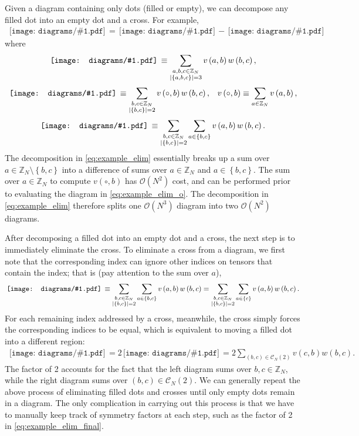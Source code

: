 \documentclass[nofootinbib,notitlepage,11pt]{revtex4-2}
\newcommand{\p}[1]{\left(#1\right)} %
\renewcommand{\set}[1]{\left\{#1\right\}} %
\newcommand{\1}{\mathds{1}}
\newcommand{\C}{\mathcal{C}}
\renewcommand{\O}{\mathcal{O}}
\newcommand{\ZZ}{\mathbb{Z}}
\newcommand{\diagram}[1]
{\,\texttt{[image: diagrams/\#1.pdf]}\,}
\begin{document}
Given a diagram containing only dots (filled or empty), we can
decompose any filled dot into an empty dot and a cross.  For example,
\begin{align}
  \diagram{example_elim}
  = \diagram{example_elim_o}
  - \diagram{example_elim_x}
  \label{eq:example_elim}
\end{align}
where
\begin{align}
  \diagram{example_elim}
  \equiv \sum_{\substack{a,b,c\in\ZZ_N\\\abs{\set{a,b,c}}=3}}
  v\p{a,b} w\p{b,c},
\end{align}
\begin{align}
  \diagram{example_elim_o}
  \equiv \sum_{\substack{b,c\in\ZZ_N\\\abs{\set{b,c}}=2}}
  v\p{\circ,b} w\p{b,c},
  &&
  v\p{\circ,b} \equiv \sum_{a\in\ZZ_N} v\p{a,b},
  \label{eq:example_elim_o}
\end{align}
\begin{align}
  \diagram{example_elim_x}
  \equiv \sum_{\substack{b,c\in\ZZ_N\\\abs{\set{b,c}}=2}}
  \sum_{a\in\set{b,c}} v\p{a,b} w\p{b,c}.
\end{align}
The decomposition in \eqref{eq:example_elim} essentially breaks up a
sum over $a\in\ZZ_N\setminus\set{b,c}$ into a difference of sums over
$a\in\ZZ_N$ and $a\in\set{b,c}$.  The sum over $a\in\ZZ_N$ to compute
$v\p{\circ,b}$ has $\O\p{N^2}$ cost, and can be performed prior to
evaluating the diagram in \eqref{eq:example_elim_o}.  The
decomposition in \eqref{eq:example_elim} therefore splits one
$\O\p{N^3}$ diagram into two $\O\p{N^2}$ diagrams.

After decomposing a filled dot into an empty dot and a cross, the next
step is to immediately eliminate the cross.  To eliminate a cross from
a diagram, we first note that the corresponding index can ignore other
indices on tensors that contain the index; that is (pay attention to
the sum over $a$),
\begin{align}
  \diagram{example_elim_x}
  \equiv \sum_{\substack{b,c\in\ZZ_N\\\abs{\set{b,c}}=2}}
  \sum_{a\in\set{b,c}} v\p{a,b} w\p{b,c}
  = \sum_{\substack{b,c\in\ZZ_N\\\abs{\set{b,c}}=2}}
  \sum_{a\in\set{c}} v\p{a,b} w\p{b,c}.
\end{align}
For each remaining index addressed by a cross, meanwhile, the cross
simply forces the corresponding indices to be equal, which is
equivalent to moving a filled dot into a different region:
\begin{align}
  \diagram{example_elim_x}
  = 2 \diagram{example_elim_x_full}
  = 2 \sum_{\p{b,c}\in\C_N\p{2}} v\p{c,b} w\p{b,c}.
  \label{eq:example_elim_final}
\end{align}
The factor of 2 accounts for the fact that the left diagram sums over
$b,c\in\ZZ_N$, while the right diagram sums over
$\p{b,c}\in\C_N\p{2}$.  We can generally repeat the above process of
eliminating filled dots and crosses until only empty dots remain in a
diagram.  The only complication in carrying out this process is that
we have to manually keep track of symmetry factors at each step, such
as the factor of 2 in \eqref{eq:example_elim_final}.
\end{document}
